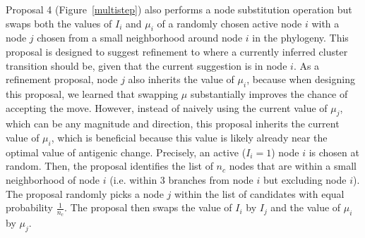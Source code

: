 \documentclass[11pt,oneside,letterpaper]{article}
\begin{document}
Proposal 4 (Figure~\ref{multistep}) also performs a node substitution operation but swaps both the values of $I_i$ and $\mu_i$ of a randomly chosen active node $i$ with a node $j$ chosen from a small neighborhood around node $i$ in the phylogeny. 
This proposal is designed to suggest refinement to where a currently inferred cluster transition should be, given that the current suggestion is in node $i$.
As a refinement proposal, node $j$ also inherits the value of $\mu_i$, because when designing this proposal, we learned that swapping $\mu$ substantially improves the chance of accepting the move.
However, instead of naively using the current value of $\mu_j$, which can be any magnitude and direction, this proposal inherits the current value of  $\mu_i$, which is beneficial because this value is likely already near the optimal value of antigenic change.
Precisely, an active ($I_i=1$) node $i$ is chosen at random.
Then, the proposal identifies the list of $n_{c}$ nodes that are within a small neighborhood of node $i$ (i.e.  within 3 branches from node $i$ but excluding node $i$).
The proposal randomly picks a node $j$ within the list of candidates with equal probability $\frac{1}{n_{c}}$.
The proposal then swaps the value of $I_i$ by $I_j$ and the value of $\mu_i$ by $\mu_j$.



\end{document}
